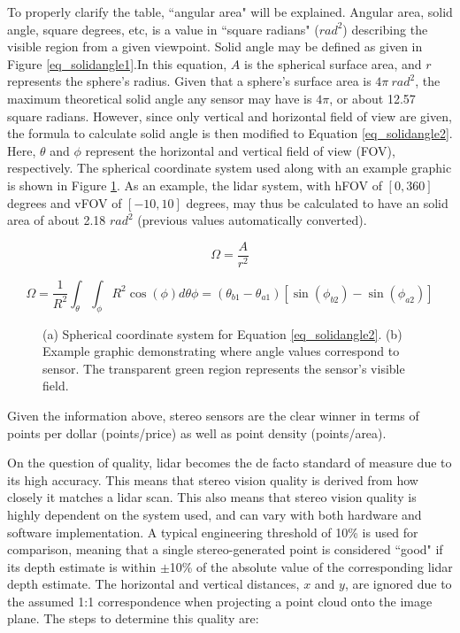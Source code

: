 To properly clarify the table, ``angular area" will be explained. Angular area, solid angle, square degrees, etc, is a value in ``square radians" ($rad^2$) describing the visible region from a given viewpoint. Solid angle may be defined as given in Figure \ref{eq_solidangle1}.In this equation, $A$ is the spherical surface area, and $r$ represents the sphere's radius. Given that a sphere's surface area is $4\pi \ rad^2$, the maximum theoretical solid angle any sensor may have is $4\pi$, or about 12.57 square radians. However, since only vertical and horizontal field of view are given, the formula to calculate solid angle is then modified to Equation \ref{eq_solidangle2}. Here, $\theta$ and $\phi$ represent the horizontal and vertical field of view (FOV), respectively. The spherical coordinate system used along with an example graphic is shown in Figure \ref{solidangle}. As an example, the lidar system, with hFOV of $[0,360]$ degrees and vFOV of $[-10,10]$ degrees, may thus be calculated to have an solid area of about 2.18 ${rad}^2$ (previous values automatically converted).

\begin{equation}
\Omega = \frac{A}{r^2}
\label{eq_solidangle1}
\end{equation}

\begin{equation}
\Omega =
\frac{1}{R^2} \int_{\theta} \int_{\phi} R^2\cos(\phi) d\theta \phi =
(\theta_{b1} - \theta_{a1})[\sin(\phi_{b2}) - \sin(\phi_{a2})]
\label{eq_solidangle2}
\end{equation}

\begin{figure}[ht]
    \centering
    \caption{(a) Spherical coordinate system for Equation \ref{eq_solidangle2}. (b) Example graphic demonstrating where angle values correspond to sensor. The transparent green region represents the sensor's visible field.}
    \label{solidangle}
\end{figure}

Given the information above, stereo sensors are the clear winner in terms of points per dollar (points/price) as well as point density (points/area).

On the question of quality, lidar becomes the de facto standard of measure due to its high accuracy.
This means that stereo vision quality is derived from how closely it matches a lidar scan. This also means that stereo vision quality is highly dependent on the system used, and can vary with both hardware and software implementation. A typical engineering threshold of 10\% is used for comparison, meaning that a single stereo-generated point is considered ``good" if its depth estimate is within $\pm$10\% of the absolute value of the corresponding lidar depth estimate. The horizontal and vertical distances, $x$ and $y$, are ignored due to the assumed 1:1 correspondence when projecting a point cloud onto the image plane. The steps to determine this quality are:

